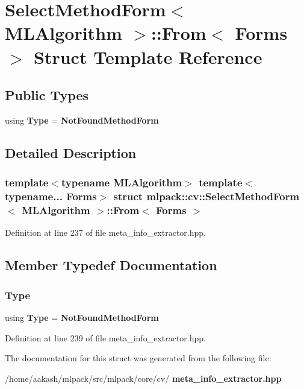 \section{Select\+Method\+Form$<$ M\+L\+Algorithm $>$\+:\+:From$<$ Forms $>$ Struct Template Reference}
\label{structmlpack_1_1cv_1_1SelectMethodForm_3_01MLAlgorithm_01_4_1_1From}
\subsection*{Public Types}
\begin{DoxyCompactItemize}
\item 
using \textbf{ Type} = \textbf{ Not\+Found\+Method\+Form}
\end{DoxyCompactItemize}


\subsection{Detailed Description}
\subsubsection*{template$<$typename M\+L\+Algorithm$>$\newline
template$<$typename... Forms$>$\newline
struct mlpack\+::cv\+::\+Select\+Method\+Form$<$ M\+L\+Algorithm $>$\+::\+From$<$ Forms $>$}



Definition at line 237 of file meta\+\_\+info\+\_\+extractor.\+hpp.



\subsection{Member Typedef Documentation}
\mbox{\label{structmlpack_1_1cv_1_1SelectMethodForm_3_01MLAlgorithm_01_4_1_1From_af6db8688c70dba853583ffd10dc948d7}} 
\subsubsection{Type}
{\footnotesize\ttfamily using \textbf{ Type} =  \textbf{ Not\+Found\+Method\+Form}}



Definition at line 239 of file meta\+\_\+info\+\_\+extractor.\+hpp.



The documentation for this struct was generated from the following file\+:\begin{DoxyCompactItemize}
\item 
/home/aakash/mlpack/src/mlpack/core/cv/\textbf{ meta\+\_\+info\+\_\+extractor.\+hpp}\end{DoxyCompactItemize}

